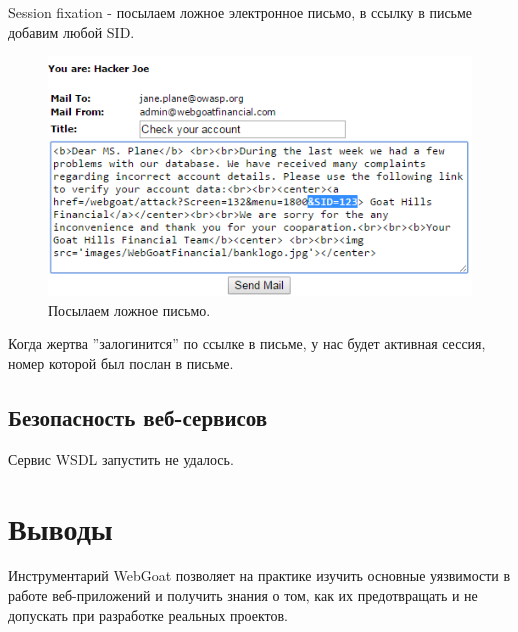 \documentclass[utf8x, 12pt]{G7-32}
\begin{document}
Session fixation -  посылаем ложное электронное письмо, в ссылку в письме добавим любой SID.
\begin{figure}[h!]
\centering
\includegraphics[width=\textwidth]{rsrc/9_1}
\caption{Посылаем ложное письмо.}
\end{figure}

Когда жертва ''залогинится'' по ссылке в письме, у нас будет активная сессия, номер которой был послан в письме.

\section{Безопасность веб-сервисов}
Сервис WSDL запустить не удалось.



\chapter{Выводы}

Инструментарий WebGoat позволяет на практике изучить основные уязвимости в работе веб-приложений и получить знания о том, как их предотвращать и не допускать при разработке реальных проектов.
\end{document}
